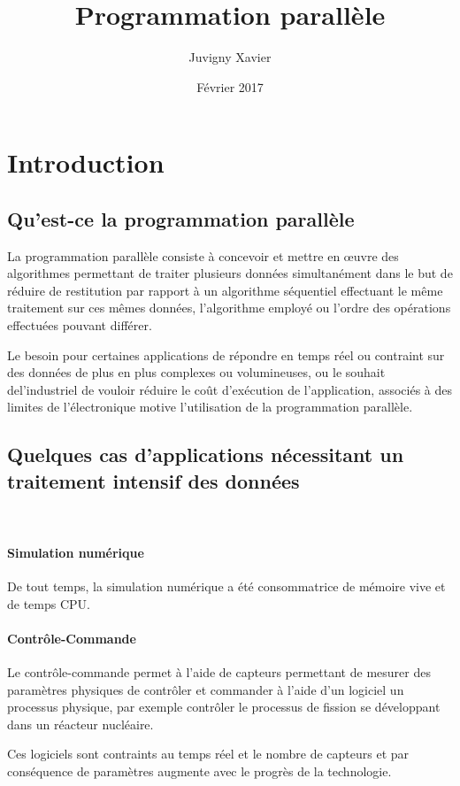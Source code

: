 \documentclass[fleqn,11pt]{article}
\title{Programmation parallèle}
\author{Juvigny Xavier}
\date{Février 2017}
\begin{document}
\maketitle
\tableofcontents

\section{Introduction}

\subsection{Qu'est-ce la programmation parallèle}

La programmation parallèle consiste à concevoir et mettre en œuvre des algorithmes permettant de traiter plusieurs données simultanément dans le but de réduire de restitution par rapport à un algorithme séquentiel effectuant le même traitement sur ces mêmes données, l'algorithme employé ou l'ordre des opérations effectuées pouvant différer. 

Le besoin pour certaines applications de répondre en temps réel ou contraint sur des données de plus en plus complexes ou volumineuses, ou le souhait del'industriel de vouloir réduire le coût d'exécution de l'application, associés à des limites de l'électronique motive l'utilisation de la programmation parallèle. 

\subsection{Quelques cas d'applications nécessitant un traitement intensif des données}
\
\paragraph{Simulation numérique }

De tout temps, la simulation numérique a été consommatrice de mémoire vive et de temps CPU. 

\paragraph{Contrôle-Commande}

Le contrôle-commande permet à l'aide de capteurs permettant de mesurer des paramètres physiques de contrôler et commander à l'aide d'un logiciel un processus physique, par exemple contrôler le processus de fission se développant dans un réacteur nucléaire. 

Ces logiciels sont contraints au temps réel et le nombre de capteurs et par conséquence de paramètres augmente avec le progrès de la technologie.
\end{document}
